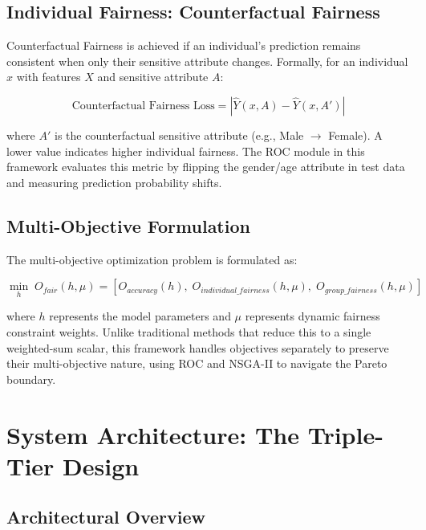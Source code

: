 \documentclass[12pt,a4paper]{article}
\begin{document}
\subsection{Individual Fairness: Counterfactual Fairness}

Counterfactual Fairness is achieved if an individual's prediction remains consistent when only their sensitive attribute changes. Formally, for an individual $x$ with features $X$ and sensitive attribute $A$:

\begin{equation}
    \text{Counterfactual Fairness Loss} = |\hat{Y}(x, A) - \hat{Y}(x, A')|
\end{equation}

where $A'$ is the counterfactual sensitive attribute (e.g., Male $\rightarrow$ Female). A lower value indicates higher individual fairness. The ROC module in this framework evaluates this metric by flipping the gender/age attribute in test data and measuring prediction probability shifts.

\subsection{Multi-Objective Formulation}

The multi-objective optimization problem is formulated as:

\begin{equation}
    \min_h \; O_{fair}(h, \mu) = \left[ O_{accuracy}(h), \; O_{individual\_fairness}(h, \mu), \; O_{group\_fairness}(h, \mu) \right]
\end{equation}

where $h$ represents the model parameters and $\mu$ represents dynamic fairness constraint weights. Unlike traditional methods that reduce this to a single weighted-sum scalar, this framework handles objectives separately to preserve their multi-objective nature, using ROC and NSGA-II to navigate the Pareto boundary.

\section{System Architecture: The Triple-Tier Design}

\subsection{Architectural Overview}
\end{document}
